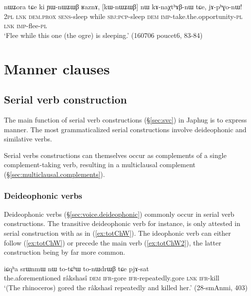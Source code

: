 \begin{exe}
\ex \label{ex:YWnWZWB.RaznA}
\gll  nɯʑora tɕe ki ɲɯ-nɯʑɯβ ʁaznɤ, [kɯ-nɯʑɯβ] nɯ kɤ-naχtʰɤβ-nɯ tɕe, jɤ-pʰɣo-nɯ! \\
\textsc{2pl} \textsc{lnk} \textsc{dem}.\textsc{prox} \textsc{sens}-sleep while \textsc{sbj}:\textsc{pcp}-sleep \textsc{dem} \textsc{imp}-take.the.opportunity-\textsc{pl} \textsc{lnk} \textsc{imp}-flee-\textsc{pl} \\
\glt `Flee while this one (the ogre) is sleeping.' (160706 poucet6, 83-84)
\end{exe}
 


\section{Manner clauses} \label{sec:manner.clauses}

\subsection{Serial verb construction} \label{sec:svc.manner}
The main function of serial verb constructions (§\ref{sec:svc}) in Japhug is to express manner. The most grammaticalized serial constructions involve deideophonic and similative verbs.


Serial verbs constructions can themselves occur as complements of a single complement-taking verb, resulting in a multiclausal complement (§\ref{sec:multiclausal.complements}).

\subsubsection{Deideophonic verbs} \label{sec:svc.deideophonic}
Deideophonic verbs (§\ref{sec:voice.deideophonic}) commonly occur in serial verb constructions. The transitive deideophonic verb  for instance, is only attested in serial construction with  as in (\ref{ex:totChW}). The ideophonic verb can either follow (\ref{ex:totChW}) or precede the main verb (\ref{ex:totChW2}), the latter construction being by far more common. 

\begin{exe}
\ex \label{ex:totChW}
\gll iɕqʰa srɯnmɯ nɯ to-tɕʰɯ to-nɯdrɯβ tɕe pjɤ-sat \\
the.aforementioned râkshasî \textsc{dem} \textsc{ifr}-gore \textsc{ifr}-repeatedly.gore  \textsc{lnk} \textsc{ifr}-kill \\
\glt `(The rhinoceros) gored the râkshasî repeatedly and killed her.' (28-smAnmi, 403)
\end{exe}

